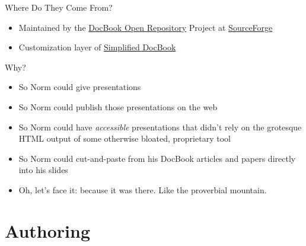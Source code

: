 \documentclass[pdf,frames,slideColor, rcas]{prosper}
\begin{document}
\begin{slide}{Where Do They Come From?}
\label{id2718464}
\begin{itemize}

	\item 
Maintained by the \href{http://docbook.sourceforge.net/}{DocBook
Open Repository} Project at
\href{http://sourceforge.net/}{SourceForge}



	\item 
Customization layer of
\href{http://www.oasis-open.org/docbook/xml/simple/}{Simplified DocBook}


\end{itemize}
\end{slide}

\begin{slide}{Why?}
\label{id2719177}
\begin{itemize}

	\item 
So Norm could give presentations



	\item 
So Norm could publish those presentations on the web



	\item 
So Norm could have {\em accessible} presentations
that didn't rely on the grotesque HTML output of some otherwise bloated, proprietary
tool



	\item 
So Norm could cut-and-paste from his DocBook articles and papers
directly into his slides



	\item 
Oh, let's face it: because it was there. Like the proverbial mountain.


\end{itemize}
\end{slide}
                                                                        

\part{Authoring            }
\label{id2719226}
\end{document}

